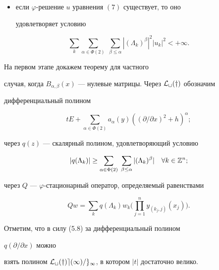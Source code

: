 \begin{thms}
\begin{itemize}
\item[2.] если $\varphi$-решение $u$ уравнения $(7)$ существует, то оно


удовлетворяет условию 


\end{itemize} 


$$ 


\sum_k 


\sum_{\alpha\in\Phi(2)}\;


\sum_{\beta\le\alpha} 


|(\Lambda_k)^\beta|^2|u_k|^2<+\infty. 


$$ 


\end{thms} 


 


\begin{pf} 


На первом этапе докажем теорему для частного 


случая, когда $B_{\alpha,\beta}(x)$ --- нулевые матрицы. Через $\cal 


L_t(y)$ обозначим 


дифференциальный полином 


$$ 


t E+\sum_{\alpha\in\Phi(2)}a_\alpha(y)((\partial/\partial x)^2 


+h)^\alpha; 


$$ 


через $q(z)$ --- скалярный полином, удовлетворяющий условию 


$$ 


|q(\Lambda_k)|\ge 


\sum_{\alpha\in\Phi(2)}\;\sum_{\beta\le\alpha} 


|(\Lambda_k)^\beta|\quad \forall k\in\Bbb Z^n; 


$$ 


через $Q$ --- $\varphi$-стационарный оператор, определяемый равенствами 


$$ 


Q w=\sum_k q(\Lambda_k)w_k\bigg(\prod^n_{j=1} 


y_{(k_j,j)}(x_j)\bigg). 


$$ 


Отметим, что в силу (5.8) за дифференциальный полином 


$q(\partial/\partial x)$ можно  


взять полином $\cal L_t(y)e(1)/g_1$, в котором $|t|$ достаточно велико. 



\end{pf}

